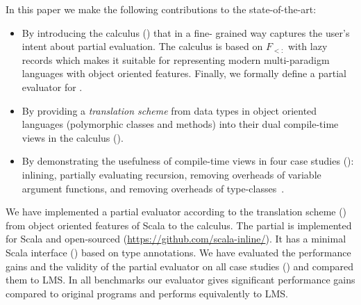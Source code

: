 In this paper we make the following contributions to the state-of-the-art:
\begin{itemize}

 \item By introducing the \calculus calculus () that in a fine-
 grained way captures the user's intent about partial evaluation. The calculus
 is based on $F_{<:}$ with lazy records which makes it suitable for representing
 modern multi-paradigm languages with object oriented features. Finally,
 we formally define a partial evaluator for \calculus.

 \item By providing a \emph{translation scheme} from data types in object oriented languages
  (polymorphic classes and methods) into their dual compile-time views in the
  \calculus calculus ().

 \item By demonstrating the usefulness of compile-time views in four case
 studies (): inlining, partially evaluating recursion,
 removing overheads of variable argument functions, and removing overheads of
 type-classes~\cite{oliveira2010type}.

\end{itemize}

We have implemented a partial evaluator according to the translation scheme ()
 from object oriented features of Scala to the \calculus calculus. The partial is
 implemented for Scala and open-sourced (\url{https://github.com/scala-inline/}).
 It has a minimal Scala interface () based on type annotations.
 We have evaluated the performance gains and the validity of the partial evaluator
 on all case studies () and compared them to LMS. In all benchmarks
 our evaluator gives significant performance gains compared to original programs and
 performs equivalently to LMS.






